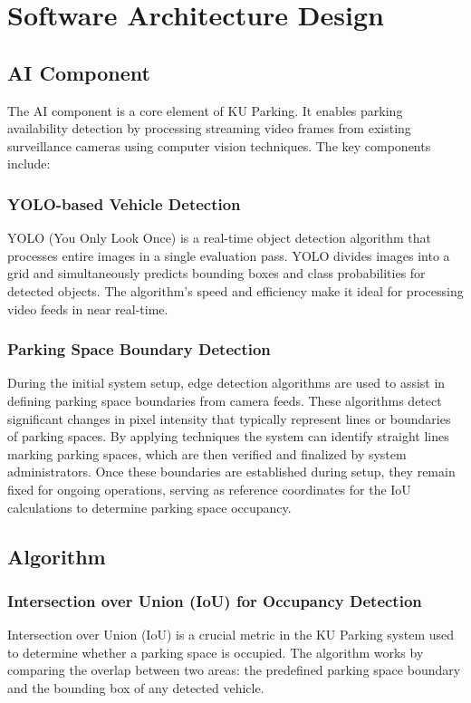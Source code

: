 \chapter{Software Architecture Design}

\section{AI Component}
\label{section:ai-component}

The AI component is a core element of KU Parking. 
It enables parking availability detection by processing streaming video frames from existing surveillance cameras using computer vision techniques. 
The key components include:

\subsection{YOLO-based Vehicle Detection}
YOLO (You Only Look Once) is a real-time object detection algorithm that processes entire images in a single evaluation pass.
YOLO divides images into a grid and simultaneously predicts bounding boxes and class probabilities for detected objects. 
The algorithm's speed and efficiency make it ideal for processing video feeds in near real-time.\cite{YOLO}

\subsection{Parking Space Boundary Detection}
During the initial system setup, edge detection algorithms are used to assist in defining parking space boundaries from camera feeds. 
These algorithms detect significant changes in pixel intensity that typically represent lines or boundaries of parking spaces. 
By applying techniques the system can identify straight lines marking parking spaces, 
which are then verified and finalized by system administrators. Once these boundaries are established during setup, 
they remain fixed for ongoing operations, serving as reference coordinates for the IoU calculations to determine parking space occupancy.


\section{Algorithm}
\label{section:algorithm}
\subsection{Intersection over Union (IoU) for Occupancy Detection}
Intersection over Union (IoU) is a crucial metric in the KU Parking system used to determine whether a parking space is occupied. 
The algorithm works by comparing the overlap between two areas: the predefined parking space boundary and the bounding box of any detected vehicle. \cite{barseghyan2023parking}


